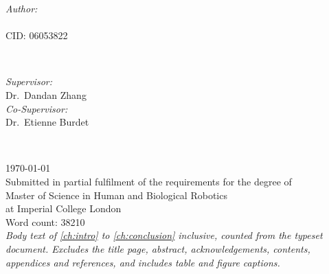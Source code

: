 \begin{titlepage}

\begin{minipage}{0.4\textwidth}
\begin{flushleft} \large
\emph{Author:}\\
\@author \\ CID: 06053822
\end{flushleft}
\end{minipage}
~
\begin{minipage}{0.4\textwidth}
\begin{flushright} \large
\emph{Supervisor:} \\
Dr.\ Dandan Zhang \\[1.2em]
\emph{Co-Supervisor:} \\
Dr.\ Etienne Burdet %
\end{flushright}
\end{minipage}\\[2cm]
\makeatother



{\large \today}\\[1.2cm]

{\normalsize Submitted in partial fulfilment of the requirements for the degree
of\\ Master of Science in Human and Biological Robotics\\ at Imperial College
London}\\[0.8cm]

{\normalsize Word count: \num{38210}\\[2pt]
{\footnotesize\itshape Body text of \cref{ch:intro} to \cref{ch:conclusion}
inclusive, counted from the typeset document. Excludes the title page,
abstract, acknowledgements, contents, appendices and references, and includes
table and figure captions.}}\\[1.0cm]

\vfill %

\end{titlepage}